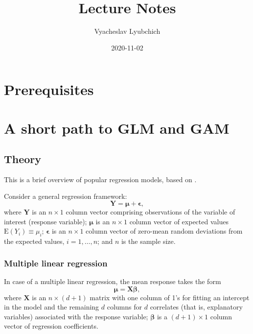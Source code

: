 \documentclass[
]{book}
\title{Lecture Notes}
\author{Vyacheslav Lyubchich}
\date{2020-11-02}
\begin{document}
\maketitle

{
\setcounter{tocdepth}{1}
\tableofcontents
}
\hypertarget{prerequisites}{%
\chapter*{Prerequisites}\label{prerequisites}}

\hypertarget{GLM}{%
\chapter{A short path to GLM and GAM}\label{GLM}}

\hypertarget{theory}{%
\section{Theory}\label{theory}}

This is a brief overview of popular regression models, based on \citet{Lyubchich:etal:2019:wires}.

Consider a general regression framework:
\begin{equation}
    \label{eq:general}
    \mathbf{Y} = \boldsymbol{\mu} + \boldsymbol{\epsilon},
\end{equation}
where \(\mathbf{Y}\) is an \(n\times1\) column vector comprising observations of the variable of interest (response variable); \(\boldsymbol{\mu}\) is an \(n\times1\) column vector of expected values \(\mathrm{E}(Y_i) \equiv \mu_i\); \(\boldsymbol{\epsilon}\) is an \(n\times1\) column vector of zero-mean random deviations from the expected values, \(i = 1,\ldots,n\); and \(n\) is the sample size.

\hypertarget{multiple-linear-regression}{%
\subsection{Multiple linear regression}\label{multiple-linear-regression}}

In case of a multiple linear regression, the mean response takes the form
\begin{equation}
    \label{eq:mlr}
    \boldsymbol{\mu} = \mathbf{X}\boldsymbol{\beta},
\end{equation}
where \(\mathbf{X}\) is an \(n\times(d+1)\) matrix with one column of 1's for fitting an intercept in the model and the remaining \(d\) columns for \(d\) correlates (that is, explanatory variables) associated with the response variable; \(\boldsymbol{\beta}\) is a \((d+1)\times 1\) column vector of regression coefficients.
\end{document}
